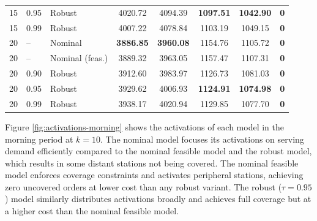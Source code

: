 \documentclass[11pt]{article}
\theoremstyle{definition}
\begin{document}
\begin{table}[h]
{\begin{tabular}{lllccccc}
			15  & 0.95   & Robust          & 4020.72          & 4094.39          & \textbf{1097.51} & \textbf{1042.90} & \textbf{0} \\
			15  & 0.99   & Robust          & 4007.22          & 4078.84          & 1103.19          & 1049.15          & \textbf{0} \\
			\midrule
			20  & --     & Nominal         & \textbf{3886.85} & \textbf{3960.08} & 1154.76          & 1105.72          & \textbf{0} \\
			20  & --     & Nominal (feas.) & 3889.32          & 3963.05          & 1157.47          & 1107.31          & \textbf{0} \\
			20  & 0.90   & Robust          & 3912.60          & 3983.97          & 1126.73          & 1081.03          & \textbf{0} \\
			20  & 0.95   & Robust          & 3929.62          & 4006.93          & \textbf{1124.91} & \textbf{1074.98} & \textbf{0} \\
			20  & 0.99   & Robust          & 3938.17          & 4020.94          & 1129.85          & 1077.70          & \textbf{0} \\
			\bottomrule
		\end{tabular}%
	}
\end{table}

Figure \ref{fig:activations-morning}
shows the activations of each model in the morning period at $k=10$. The nominal model focuses its activations on serving demand efficiently compared to the nominal feasible model and the robust model, which results in some distant stations not being covered. The nominal feasible model enforces coverage constraints and activates peripheral stations, achieving zero uncovered orders at lower cost than any robust variant. The robust ($\tau=0.95$) model similarly distributes activations broadly and achieves full coverage but at a higher cost than the nominal feasible model.
\end{document}
